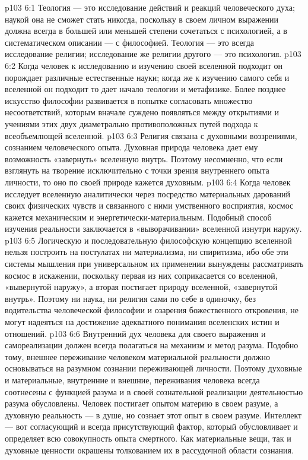 \vs p103 6:1 Теология --- это исследование действий и реакций человеческого духа; наукой она не сможет стать никогда, поскольку в своем личном выражении должна всегда в большей или меньшей степени сочетаться с психологией, а в систематическом описании --- с философией. Теология --- это всегда исследование  религии; исследование же религии другого --- это психология.
\vs p103 6:2 \pc Когда человек к исследованию и изучению своей вселенной подходит  он порождает различные естественные науки; когда же к изучению самого себя и вселенной он подходит  то дает начало теологии и метафизике. Более позднее искусство философии развивается в попытке согласовать множество несоответствий, которым вначале суждено появляться между открытиями и учениями этих двух диаметрально противоположных путей подхода к всеобъемлющей вселенной.
\vs p103 6:3 Религия связана с духовными воззрениями, сознанием  человеческого опыта. Духовная природа человека дает ему возможность «завернуть» вселенную внутрь. Поэтому несомненно, что если взглянуть на творение исключительно с точки зрения внутреннего опыта личности, то оно по своей природе кажется духовным.
\vs p103 6:4 Когда человек исследует вселенную аналитически через посредство материальных дарований своих физических чувств и связанного с ними умственного восприятия, космос кажется механическим и энергетически\hyp{}материальным. Подобный способ изучения реальности заключается в «выворачивании» вселенной изнутри наружу.
\vs p103 6:5 \pc Логическую и последовательную философскую концепцию вселенной нельзя построить на постулатах ни материализма, ни спиритизма, ибо обе эти системы мышления при универсальном их применении вынуждены рассматривать космос в искажении, поскольку первая из них соприкасается со вселенной, «вывернутой наружу», а вторая постигает природу вселенной, «завернутой внутрь». Поэтому ни наука, ни религия сами по себе в одиночку, без водительства человеческой философии и озарения божественного откровения, не могут надеяться на достижение адекватного понимания вселенских истин и отношений.
\vs p103 6:6 Внутренний дух человека для своего выражения и самореализации должен всегда полагаться на механизм и метод разума. Подобно тому, внешнее переживание человеком материальной реальности должно основываться на разумном сознании переживающей личности. Поэтому духовные и материальные, внутренние и внешние, переживания человека всегда соотнесены с функцией разума и в своей сознательной реализации деятельностью разума обусловлены. Человек постигает опытом материю в своем разуме, а духовную реальность --- в душе, но сознает этот опыт в своем разуме. Интеллект --- вот согласующий и всегда присутствующий фактор, который обусловливает и определяет всю совокупность опыта смертного. Как материальные вещи, так и духовные ценности окрашены толкованием их в рассудочной области сознания.
